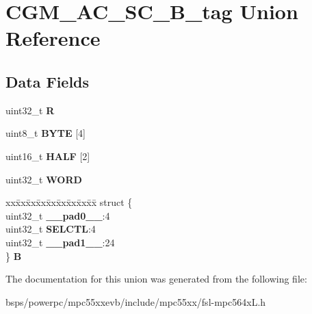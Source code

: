 \hypertarget{unionCGM__AC__SC__32B__tag}{}\section{C\+G\+M\+\_\+\+A\+C\+\_\+\+S\+C\+\_\+B\+\_\+tag Union Reference}
\label{unionCGM__AC__SC__32B__tag}
\subsection*{Data Fields}
\begin{DoxyCompactItemize}
\item 
\mbox{\label{unionCGM__AC__SC__32B__tag_a71f6ceb9f1657ec67e939c890f90dcac}} 
uint32\+\_\+t {\bfseries R}
\item 
\mbox{\label{unionCGM__AC__SC__32B__tag_aa3a1899ee7e3d9c93989481a72aea1c5}} 
uint8\+\_\+t {\bfseries B\+Y\+TE} \mbox{[}4\mbox{]}
\item 
\mbox{\label{unionCGM__AC__SC__32B__tag_aef9d9867e2c243fde4e030579df9c386}} 
uint16\+\_\+t {\bfseries H\+A\+LF} \mbox{[}2\mbox{]}
\item 
\mbox{\label{unionCGM__AC__SC__32B__tag_a6d06ddb822b987906bbf2d67d54c15d5}} 
uint32\+\_\+t {\bfseries W\+O\+RD}
\item 
\mbox{\label{unionCGM__AC__SC__32B__tag_a672c70d6051839c37f1f993a44106a1f}} 
\begin{tabbing}
xx\=xx\=xx\=xx\=xx\=xx\=xx\=xx\=xx\=\kill
struct \{\\
\>uint32\_t {\bfseries \_\_pad0\_\_}:4\\
\>uint32\_t {\bfseries SELCTL}:4\\
\>uint32\_t {\bfseries \_\_pad1\_\_}:24\\
\} {\bfseries B}\\

\end{tabbing}\end{DoxyCompactItemize}


The documentation for this union was generated from the following file\+:\begin{DoxyCompactItemize}
\item 
bsps/powerpc/mpc55xxevb/include/mpc55xx/fsl-\/mpc564x\+L.\+h\end{DoxyCompactItemize}
